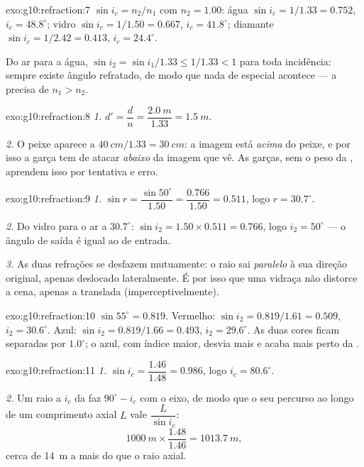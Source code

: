 \begin{solution}{exo:g10:refraction:7}
$\sin i_c = n_2/n_1$ com $n_2 = 1.00$:
água $\sin i_c = 1/1.33 = 0.752$, $i_c = 48.8^\circ$;
vidro $\sin i_c = 1/1.50 = 0.667$, $i_c = 41.8^\circ$;
diamante $\sin i_c = 1/2.42 = 0.413$, $i_c = 24.4^\circ$.

Do ar para a água, $\sin i_2 = \sin i_1/1.33 \leq 1/1.33 < 1$ para toda
incidência: sempre existe ângulo refratado, de modo que nada de especial
acontece --- a  precisa de $n_1 > n_2$.
\end{solution}

\begin{solution}{exo:g10:refraction:8}
\emph{1.} $d' = \dfrac{d}{n} = \dfrac{\qty{2.0}{m}}{1.33}
= \qty{1.5}{m}$.

\emph{2.} O peixe aparece a $\qty{40}{cm}/1.33 = \qty{30}{cm}$: a imagem
está \emph{acima} do peixe, e por isso a garça tem de atacar
\emph{abaixo} da imagem que vê. As garças, sem o peso da ,
aprendem isso por tentativa e erro.
\end{solution}

\begin{solution}{exo:g10:refraction:9}
\emph{1.} $\sin r = \dfrac{\sin 50^\circ}{1.50} = \dfrac{0.766}{1.50}
= 0.511$, logo $r = 30.7^\circ$.

\emph{2.} Do vidro para o ar a $30.7^\circ$:
$\sin i_2 = 1.50 \times 0.511 = 0.766$, logo $i_2 = 50^\circ$ --- o
ângulo de saída é igual ao de entrada.

\emph{3.} As duas refrações se desfazem mutuamente: o raio sai
\emph{paralelo} à sua direção original, apenas deslocado lateralmente. É
por isso que uma vidraça não distorce a cena, apenas a translada
(imperceptivelmente).
\end{solution}

\begin{solution}{exo:g10:refraction:10}
$\sin 55^\circ = 0.819$. Vermelho:
$\sin i_2 = 0.819/1.61 = 0.509$, $i_2 = 30.6^\circ$. Azul:
$\sin i_2 = 0.819/1.66 = 0.493$, $i_2 = 29.6^\circ$. As duas cores ficam
separadas por $1.0^\circ$; o azul, com índice maior, desvia mais e acaba
mais perto da .
\end{solution}

\begin{solution}{exo:g10:refraction:11}
\emph{1.} $\sin i_c = \dfrac{1.46}{1.48} = 0.986$, logo
$i_c = 80.6^\circ$.

\emph{2.} Um raio a $i_c$ da  faz $90^\circ - i_c$ com o eixo, de
modo que o seu percurso ao longo de um comprimento axial $L$ vale
$\dfrac{L}{\sin i_c}$:
\[
\qty{1000}{m} \times \frac{1.48}{1.46} = \qty{1013.7}{m},
\]
cerca de \qty{14}{m} a mais do que o raio axial.
\end{solution}

